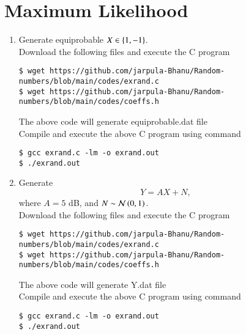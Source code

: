 \documentclass[journal,12pt,twocolumn]{IEEEtran}
\renewcommand\thesection{\arabic{section}}
\begin{document}
\section{Maximum Likelihood}
\begin{enumerate}[label=\thesection.\arabic*
,ref=\thesection.\theenumi]
\item Generate equiprobable $X \in \left\{1,-1\right\}$.\\
\solution Download the following files and execute the C program
\begin{lstlisting}
$ wget https://github.com/jarpula-Bhanu/Random-numbers/blob/main/codes/exrand.c
$ wget https://github.com/jarpula-Bhanu/Random-numbers/blob/main/codes/coeffs.h
\end{lstlisting}
The above code will generate equiprobable.dat file\\
Compile and execute the above C program using command
\begin{lstlisting}
$ gcc exrand.c -lm -o exrand.out
$ ./exrand.out
\end{lstlisting}

\item Generate 
\begin{equation}
Y = AX+N,
\end{equation}
		where $A = 5$ dB,  and $N \sim \mathcal{N}\left(0,1\right)$.\\
\solution
Download the following files and execute the C program
\begin{lstlisting}
$ wget https://github.com/jarpula-Bhanu/Random-numbers/blob/main/codes/exrand.c
$ wget https://github.com/jarpula-Bhanu/Random-numbers/blob/main/codes/coeffs.h
\end{lstlisting}
The above code will generate Y.dat file\\
Compile and execute the above C program using command
\begin{lstlisting}
$ gcc exrand.c -lm -o exrand.out
$ ./exrand.out
\end{lstlisting}


\end{enumerate}
\end{document}
